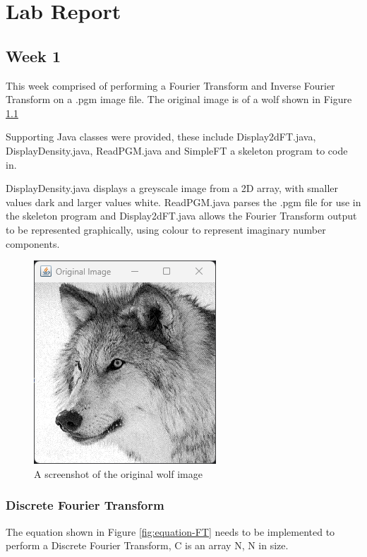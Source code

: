 \chapter{Lab Report}
\section{Week 1}
    This week comprised of performing a Fourier Transform and Inverse Fourier Transform on a .pgm image file. The original image is of a wolf shown in Figure \ref{fig:wolf_image}

    Supporting Java classes were provided, these include Display2dFT.java, DisplayDensity.java, ReadPGM.java and SimpleFT a skeleton program to code in.

    DisplayDensity.java displays a greyscale image from a 2D array, with smaller values dark and larger values white. ReadPGM.java parses the .pgm file for use in the skeleton program and Display2dFT.java allows the Fourier Transform output to be represented graphically, using colour to represent imaginary number components.
    
    \begin{figure}[H]
        \centering
        \includegraphics[width=0.49\columnwidth]{Figures/Week 1/W1-Wolf-Original.png}
        \caption{A screenshot of the original wolf image}
        \label{fig:wolf_image}
        
    \end{figure}
    
    \subsection{Discrete Fourier Transform}
    The equation shown in Figure \ref{fig:equation-FT} needs to be implemented to perform a Discrete Fourier Transform, C is an array N, N in size.
    \vspace{15mm}


